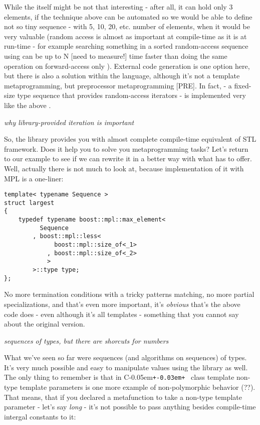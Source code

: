 \documentclass{netobjectdays}
\newcommand{\Cpp}{C\kern-0.05em\texttt{+\kern-0.03em+}%
}
\begin{document}
While the  itself might be not that 
interesting - after all, it can hold only 3 elements, if 
the technique above can be automated so we would be able to 
define not so tiny sequence - with 5, 10, 20, etc. number 
of elements, when it would be very valuable (random access 
is almost as important at compile-time as it is at run-time 
- for example searching something in a sorted random-access 
sequence using  can be up to N 
[need to measure!] time faster than doing the same operation 
on forward-access only ). External code generation 
is one option here, but there is also a solution within the 
language, although it's not a template metaprogramming, 
but preprocessor metaprogramming [PRE]. In fact, 
 - a fixed-size type sequence that 
provides random-access iterators - is implemented very like 
the above . 

\emph{why library-provided iteration is important}

So, the library provides you with almost complete compile-time 
equivalent of STL framework. Does it help you to solve you 
metaprogramming tasks? Let's return to our  
example to see if we can rewrite it in a better way with what 
 has to offer. Well, actually there is not 
much to look at, because implementation of it with MPL is a 
one-liner:

{\footnotesize
\begin{verbatim}
template< typename Sequence >
struct largest
{
    typedef typename boost::mpl::max_element<
          Sequence
        , boost::mpl::less<
              boost::mpl::size_of<_1>
            , boost::mpl::size_of<_2>
            >
        >::type type;
};
\end{verbatim}
}

No more termination conditions with a tricky patterns matching, 
no more partial specializations, and that's even more important, 
it's \emph{obvious} that's the above code does - even although 
it's all templates - something that you cannot say about the 
original version.


\emph{sequences of types, but there are shorcuts for numbers}

What we've seen so far were sequences (and algorithms on 
sequences) of types. It's very much possible and easy to 
manipulate values using the library as well. The only thing 
to remember is that in \Cpp\ class template non-type template 
parameters is one more example of non-polymorphic behavior (??).
That means, that if you declared a metafunction to take a 
non-type template parameter - let's say \emph{long} - 
it's not possible to pass anything besides compile-time 
intergal constants to it:
\end{document}
